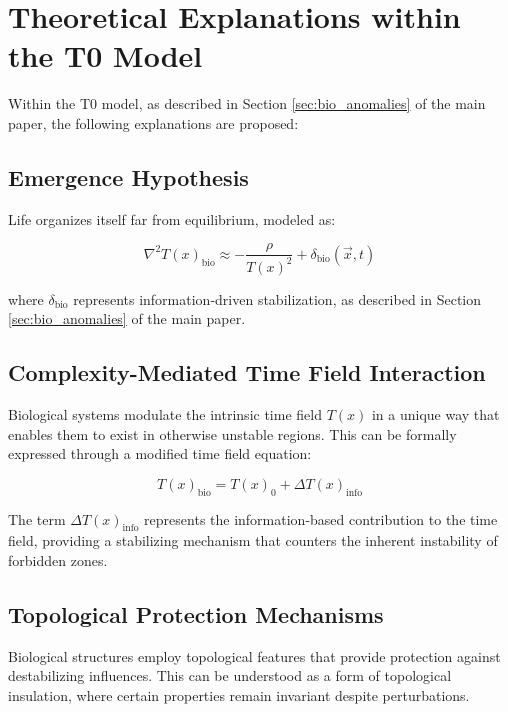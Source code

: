 \documentclass[12pt,a4paper]{article}
\newcommand{\Tfield}{T(x)}
\begin{document}
	\section{Theoretical Explanations within the T0 Model}
	\label{sec:theoretical_explanations}
	
	Within the T0 model, as described in Section \ref{sec:bio_anomalies} of the main paper, the following explanations are proposed:
	
	\subsection{Emergence Hypothesis}
	\label{subsec:emergence_hypothesis}
	
	Life organizes itself far from equilibrium, modeled as:
	
	\begin{equation}
		\nabla^2\Tfield_{\text{bio}} \approx -\frac{\rho}{\Tfield^2} + \delta_{\text{bio}}(\vec{x}, t)
	\end{equation}
	
	where \(\delta_{\text{bio}}\) represents information-driven stabilization, as described in Section \ref{sec:bio_anomalies} of the main paper.
	
	\subsection{Complexity-Mediated Time Field Interaction}
	\label{subsec:complexity_interaction}
	
	Biological systems modulate the intrinsic time field \(\Tfield\) in a unique way that enables them to exist in otherwise unstable regions. This can be formally expressed through a modified time field equation:
	
	\begin{equation}
		\Tfield_{\text{bio}} = \Tfield_0 + \Delta\Tfield_{\text{info}}
	\end{equation}
	
	The term \(\Delta\Tfield_{\text{info}}\) represents the information-based contribution to the time field, providing a stabilizing mechanism that counters the inherent instability of forbidden zones.
	
	\subsection{Topological Protection Mechanisms}
	\label{subsec:topological_protection}
	
	Biological structures employ topological features that provide protection against destabilizing influences. This can be understood as a form of topological insulation, where certain properties remain invariant despite perturbations.
	
\end{document}
